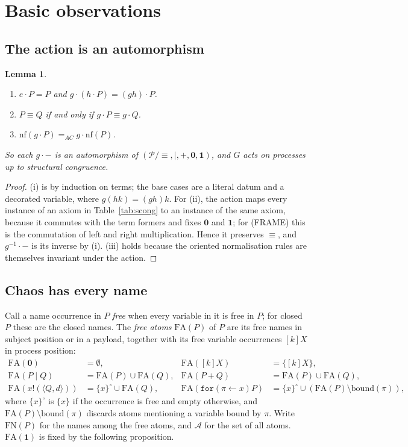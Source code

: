 \documentclass[11pt]{article}
\newtheorem{lemma}[theorem]{Lemma}
\theoremstyle{definition}
\theoremstyle{remark}
\newcommand{\nil}{\mathbf{0}}
\newcommand{\chaos}{\mathbf{1}}
\newcommand{\rcv}[3]{\mathtt{for}(#1 \leftarrow #2)#3}
\newcommand{\out}[3]{#1!(\langle #2, #3\rangle)}
\newcommand{\act}[2]{#1\cdot #2}
\newcommand{\scong}{\equiv}
\newcommand{\FN}{\mathrm{FN}}
\newcommand{\nf}{\mathrm{nf}}
\newcommand{\Proc}{\mathcal{P}}
\newcommand{\fr}[2]{[#1]#2}
\newcommand{\FA}{\mathrm{FA}}
\newcommand{\Atoms}{\mathcal{A}}
\begin{document}
\section{Basic observations}\label{sec:obs}

\subsection{The action is an automorphism}

\begin{lemma}\label{lem:auto}
\begin{enumerate}[label=(\roman*)]
\item $\act{e}{P}=P$ and $\act{g}{(\act{h}{P})}=\act{(gh)}{P}$.
\item $P\scong Q$ if and only if $\act{g}{P}\scong\act{g}{Q}$.
\item $\nf(\act{g}{P}) =_{AC} \act{g}{\nf(P)}$.
\end{enumerate}
So each $\act{g}{-}$ is an automorphism of
$(\Proc/{\scong},\mid,+,\nil,\chaos)$, and $G$ acts on processes up to
structural congruence.
\end{lemma}

\begin{proof}
(i) is by induction on terms; the base cases are a literal datum and a
decorated variable, where $g(hk)=(gh)k$. For (ii), the action maps every
instance of an axiom in Table~\ref{tab:scong} to an instance of the same
axiom, because it commutes with the term formers and fixes $\nil$ and
$\chaos$; for (FRAME) this is the commutation of left and right multiplication. Hence it preserves
$\scong$, and $\act{g^{-1}}{-}$ is its inverse by (i). (iii) holds because the
oriented normalisation rules are themselves invariant under the action.
\end{proof}

\subsection{Chaos has every name}

Call a name occurrence in $P$ \emph{free} when every variable in it is free
in $P$; for closed $P$ these are the closed names. The \emph{free atoms}
$\FA(P)$ of $P$ are its free names in subject position or in a payload,
together with its free variable occurrences $\fr{k}{X}$ in process position:
\begin{align*}
\FA(\nil)&=\emptyset, &
\FA(\fr{k}{X})&=\{\fr{k}{X}\},\\
\FA(P\mid Q)&=\FA(P)\cup\FA(Q), &
\FA(P+Q)&=\FA(P)\cup\FA(Q),\\
\FA(\out{x}{Q}{d})&=\{x\}^{\circ}\cup\FA(Q), &
\FA(\rcv{\pi}{x}{P})&=\{x\}^{\circ}\cup(\FA(P)\setminus\mathrm{bound}(\pi)),
\end{align*}
where $\{x\}^{\circ}$ is $\{x\}$ if the occurrence is free and empty otherwise,
and $\FA(P)\setminus\mathrm{bound}(\pi)$ discards atoms mentioning a variable
bound by $\pi$. Write $\FN(P)$ for the names among the free atoms, and
$\Atoms$ for the set of all atoms. $\FA(\chaos)$ is fixed by the following
proposition.
\end{document}
